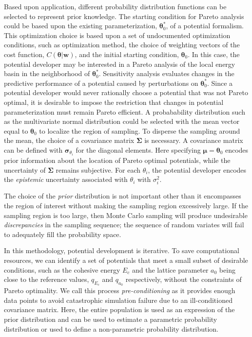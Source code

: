 Based upon application, different probability distribution functions can be selected to represent prior knowledge.  The starting condition for Pareto analysis could be based upon the existing parameterization, $\bm{\theta}_0^*$, of a potential formalism.  This optimization choice is based upon a set of undocumented optimization conditions, such as optimization method, the choice of weighting vectors of the cost function, $C(\bm{\theta}|\bm{w})$, and the initial starting condition, $\bm{\theta}_0$.  In this case, the potential developer may be interested in a Pareto analysis of the local energy basin in the neighborhood of  $\bm{\theta}_0^*$.  Sensitivity analysis evaluates changes in the predictive performance of a potential caused by perturbations on $\bm{\theta}_0^*$.  Since a potential developer would never rationally choose a potential that was not Pareto optimal, it is desirable to impose the restriction that changes in potential parameterization must remain Pareto efficient.  A probabability distribution such as the multivariate normal distribution could be selected with the mean vector equal to $\bm{\theta}_0$ to localize the region of sampling.  To disperse the sampling around the mean, the choice of a covariance matrix $\bm{\Sigma}$ is necessary.  A covariance matrix can be defined with $\bm{\sigma}_{\theta_i}$ for the diagonal elements.
Here specifying $\bm{\mu} = \bm{\theta}_0$ encodes prior information about the location of Pareto optimal potentials, while the uncertainty of $\bm{\Sigma}$ remains subjective.  For each $\theta_i$, the potential developer encodes the \emph{epistemic} uncertainty associated with $\theta_i$ with $\sigma_i^2$.

The choice of the \emph{prior} distribution is not important other than it encompasses the region of interest without making the sampling region excessively large.  If the sampling region is too large, then Monte Carlo sampling will produce undesirable \emph{discrepancies} in the sampling sequence; the sequence of random variates will fail to adequately fill the probability space.

In this methodology, potential development is iterative.  To save computational resources, we can identify a set of potentials that meet a small subset of desirable conditions, such as the cohesive energy $E_c$ and the lattice parameter $a_0$ being close to the reference values, $q_{E_c}$ and $q_{a_0}$ respectively, without the constraints of Pareto optimality.  We call this process \emph{pre-conditioning} as it provides enough data points to avoid catastrophic simulation failure due to an ill-conditioned covariance matrix.  Here, the entire population is used as an expression of the prior distribution and can be used to estimate a parametric probability distribution or used to define a non-parametric probability distribution.

